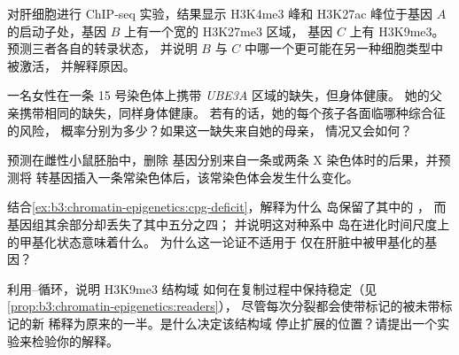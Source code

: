 \begin{exercise}[$\star\star$]\label{exo:b3:chromatin-epigenetics:7}
对肝细胞进行 ChIP-seq 实验，结果显示 H3K4me3 峰和
H3K27ac 峰位于基因 $A$ 的启动子处，基因 $B$ 上有一个宽的 H3K27me3 区域，
基因 $C$ 上有 H3K9me3。预测三者各自的转录状态，
并说明 $B$ 与 $C$ 中哪一个更可能在另一种细胞类型中被激活，
并解释原因。
\end{exercise}

\begin{exercise}[$\star\star$]\label{exo:b3:chromatin-epigenetics:8}
一名女性在一条 15 号染色体上携带 \emph{UBE3A} 区域的缺失，但身体健康。
她的父亲携带相同的缺失，同样身体健康。
若有的话，她的每个孩子各面临哪种综合征的风险，
概率分别为多少？如果这一缺失来自她的母亲，
情况又会如何？
\end{exercise}

\begin{exercise}[$\star\star$]\label{exo:b3:chromatin-epigenetics:9}
预测在雌性小鼠胚胎中，删除
\emph{} 基因分别来自一条或两条 X 染色体时的后果，并预测将
\emph{} 转基因插入一条常染色体后，该常染色体会发生什么变化。
\end{exercise}

\begin{exercise}[$\star\star\star$]\label{exo:b3:chromatin-epigenetics:10}
结合\cref{ex:b3:chromatin-epigenetics:cpg-deficit}，解释为什么  岛保留了其中的 ，
而基因组其余部分却丢失了其中五分之四；
并说明这对种系中  岛在进化时间尺度上的甲基化状态意味着什么。
为什么这一论证不适用于
仅在肝脏中被甲基化的基因？
\end{exercise}

\begin{exercise}[$\star\star\star$]\label{exo:b3:chromatin-epigenetics:11}
利用–循环，说明 H3K9me3 结构域
如何在复制过程中保持稳定（见\cref{prop:b3:chromatin-epigenetics:readers}），
尽管每次分裂都会使带标记的被未带标记的新
稀释为原来的一半。是什么决定该结构域
停止扩展的位置？请提出一个实验来检验你的解释。
\end{exercise}

